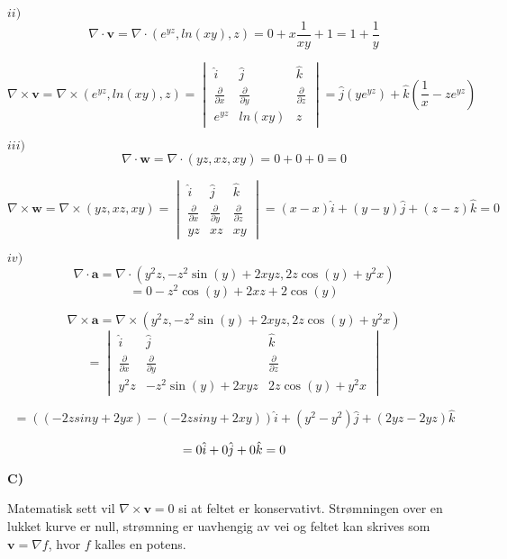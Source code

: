 \documentclass[a4paper,norsk,11pt,twoside]{article}
\begin{document}
$ii)$\\

$$
\nabla \cdot \textbf{v} = \nabla \cdot (e^{yz},ln(xy),z) = 0 + x\frac{1}{xy} + 1 = 1 + \frac{1}{y}
$$

$$
\nabla\times \textbf{v} = \nabla \times(e^{yz},ln(xy),z) 
=\begin{vmatrix}
\hat i & \hat j & \hat k \\
\frac{\partial}{\partial x} & \frac{\partial}{\partial y} & \frac{\partial}{\partial z} \\
e^{yz} & ln(xy) & z
\end{vmatrix}
=\hat{j}(ye^{yz}) + \hat{k}(\frac{1}{x} - ze^{yz})
$$

$iii)$\\

$$
\nabla\cdot \textbf{w} = \nabla \cdot (yz,xz,xy) = 0 + 0 + 0 = 0
$$

$$
\nabla \times \textbf{w} = \nabla \times (yz,xz,xy) 
=\begin{vmatrix}
\hat i & \hat j & \hat k \\
\frac{\partial}{\partial x} & \frac{\partial}{\partial y} & \frac{\partial}{\partial z} \\
yz & xz & xy
\end{vmatrix}
=\left(x - x \right) \hat i + \left(y - y \right) \hat j + \left({z} - z \right) \hat k = 0
$$

$iv)$\\

$$
\nabla \cdot \textbf{a} = \nabla \cdot (y^{2}z,-z^{2}\sin(y) + 2xyz, 2z\cos(y) + y^{2}x)
$$
$$
= 0 -z^{2}\cos(y) + 2xz + 2\cos(y)
$$

$$
\nabla \times \textbf{a} = \nabla \times  (y^{2}z,-z^{2}\sin(y) + 2xyz, 2z\cos(y) + y^{2}x)
$$
$$
=\begin{vmatrix}
\hat i & \hat j & \hat k \\
\frac{\partial}{\partial x} & \frac{\partial}{\partial y} & \frac{\partial}{\partial z} \\
y^{2}z & -z^{2}\sin(y) + 2xyz & 2z\cos(y) + y^{2}x
\end{vmatrix}
$$

$$
=\left((-2zsiny + 2yx) - (-2zsiny+2xy) \right) \hat i + \left(y^2 - y^2 \right) \hat j + \left(2yz -2yz \right) \hat k 
$$

$$
\def\doubleunderline#1{\underline{\underline{#1}}}
= 0 \hat i + 0 \hat j + 0\hat{k} = 0
$$

\textbf{C)}

Matematisk sett vil $\nabla\times \textbf{v} = 0$ si at feltet er konservativt. Strømningen over en lukket kurve er null, strømning er uavhengig av vei og feltet kan skrives som $\textbf{v} = \nabla f$, hvor $f$ kalles en potens.\\
\end{document}
